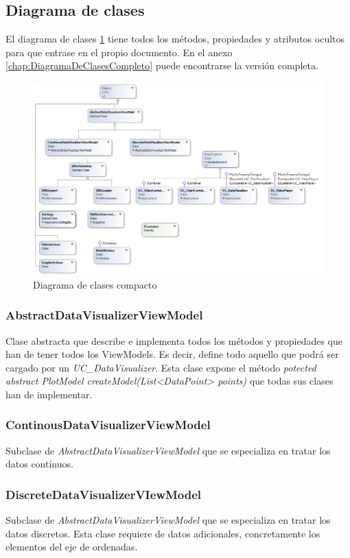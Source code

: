 \subsection{Diagrama de clases}
El diagrama de clases \ref{fig:ClassDiagram} tiene todos los m\'etodos, propiedades y atributos ocultos para que entrase
en el propio documento. En el anexo \ref{chap:DiagramaDeClasesCompleto} puede encontrarse la versi\'on completa.

\begin{figure}[H]
	\centering
	\includegraphics[width=1.2\linewidth]{./Figures/ClassDiagram}
	\caption[Diagrama de clases compacto]{Diagrama de clases compacto}
	\label{fig:ClassDiagram}
\end{figure}

\subsubsection{AbstractDataVisualizerViewModel}
Clase abstracta que describe e implementa todos los m\'etodos y propiedades que han de tener todos los ViewModels. Es decir,
define todo aquello que podr\'a ser cargado por un \emph{UC\_DataVisualizer}. Esta clase expone el m\'etodo
\emph{potected abstract PlotModel createModel(List<DataPoint> points)}
que todas sus clases han de implementar.

\subsubsection{ContinousDataVisualizerViewModel}
Subclase de \emph{AbstractDataVisualizerViewModel} que se especializa en tratar los datos cont\'inuos. 

\subsubsection{DiscreteDataVisualizerVIewModel}
Subclase de \emph{AbstractDataVisualizerViewModel} que se especializa en tratar los datos discretos.
Esta clase requiere de datos adicionales, concretamente los elementos del eje de ordenadas.

